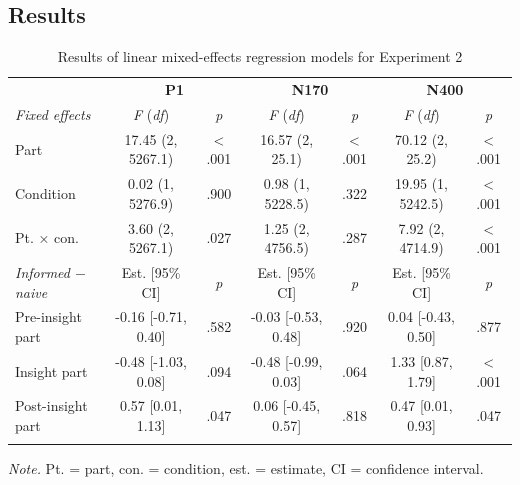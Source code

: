 \documentclass[
  english,
  doc,12pt,twoside,floatsintext]{apa7}
\begin{document}
\hypertarget{results-1}{%
\subsection{Results}\label{results-1}}

\begin{table}[tbp]

\begin{center}
\begin{threeparttable}

\caption{\label{tab:exp2-table}Results of linear mixed-effects regression models for Experiment 2}

\footnotesize{

\begin{tabular}{lcccccc}
\toprule
 & \multicolumn{2}{c}{\textbf{P1}} & \multicolumn{2}{c}{\textbf{N170}} & \multicolumn{2}{c}{\textbf{N400}} \\
\cmidrule(r){2-3} \cmidrule(r){4-5} \cmidrule(r){6-7}
\textit{Fixed effects} & \textit{F} (\textit{df}) & \textit{p} & \textit{F} (\textit{df}) & \textit{p} & \textit{F} (\textit{df}) & \textit{p}\\
\midrule
Part & 17.45 (2, 5267.1) & < .001 & 16.57 (2, 25.1) & < .001 & 70.12 (2, 25.2) & < .001\\
Condition & 0.02 (1, 5276.9) & .900 & 0.98 (1, 5228.5) & .322 & 19.95 (1, 5242.5) & < .001\\
Pt. × con. & 3.60 (2, 5267.1) & .027 & 1.25 (2, 4756.5) & .287 & 7.92 (2, 4714.9) & < .001\\
\textit{Informed $-$  naive} & Est. [95\% CI] & \textit{p} & Est. [95\% CI] & \textit{p} & Est. [95\% CI] & \textit{p}\\ \midrule
Pre-insight part & -0.16 [-0.71, 0.40] & .582 & -0.03 [-0.53, 0.48] & .920 & 0.04 [-0.43, 0.50] & .877\\
Insight part & -0.48 [-1.03, 0.08] & .094 & -0.48 [-0.99, 0.03] & .064 & 1.33 [0.87, 1.79] & < .001\\
Post-insight part & 0.57 [0.01, 1.13] & .047 & 0.06 [-0.45, 0.57] & .818 & 0.47 [0.01, 0.93] & .047\\
\bottomrule
\addlinespace
\end{tabular}

}

\begin{tablenotes}[para]
\normalsize{\textit{Note.} Pt. = part, con. = condition, est. = estimate, CI = confidence interval.}
\end{tablenotes}

\end{threeparttable}
\end{center}

\end{table}
\end{document}
